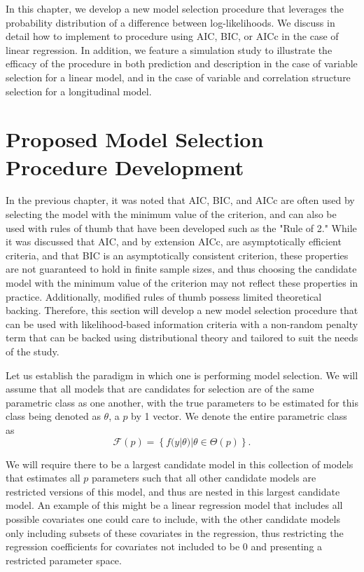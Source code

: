 \doublespace		
{}
		In this chapter, we develop a new model selection procedure that leverages the probability distribution of a difference between log-likelihoods. We discuss in detail how
		to implement to procedure using AIC, BIC, or AICc in the case of linear regression.  In addition, we feature a simulation study to illustrate the efficacy of the procedure
		in both prediction and description in the case of variable selection for a linear model, and in the case of variable and correlation structure selection for a longitudinal model.

		\section{Proposed Model Selection Procedure Development} \label{sec:proposed_method}
		In the previous chapter, it was noted that AIC, BIC, and AICc are often used by selecting the model with the minimum value of the criterion, and can also be used with
		rules of thumb that have been developed such as the "Rule of 2." While it was discussed that AIC, and by extension AICc, are asymptotically efficient criteria,
		and that BIC is an asymptotically consistent criterion, these properties are not guaranteed to hold in finite sample sizes, and thus choosing the candidate model with
		the minimum value of the criterion may not reflect these properties in practice. Additionally, modified rules of thumb possess limited theoretical backing. Therefore,
		this section will develop a new model selection procedure that can be used with likelihood-based information criteria with a non-random penalty term that can be backed
		using distributional theory and tailored to suit the needs of the study.
		
		Let us establish the paradigm in which one is performing model selection. We will assume that all models that are candidates for selection are of the same parametric
		class as one another, with the true parameters to be estimated for this class being denoted as $\theta$, a $p$ by 1 vector. We denote the entire parametric class as
		\begin{equation}
			\mathcal{F}(p) = \left\{ f(y|\theta) | \theta \in \Theta(p) \right\} .
		\end{equation}

		We will require there to be a largest candidate model in this collection of models that estimates all $p$ parameters such that all other candidate models are restricted
		versions of this model, and thus are nested in this largest candidate model. An example of this might be a linear regression model that includes all possible covariates
		one could care to include, with the other candidate models only including subsets of these covariates in the regression, thus restricting the regression coefficients for
		covariates not included to be 0 and presenting a restricted parameter space.

